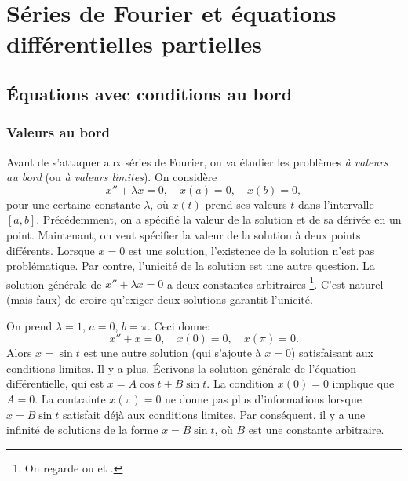 \chapter{Séries de Fourier et équations différentielles partielles} \label{FS:chapter}


\section{Équations avec conditions au bord} \label{bvp:section}


\subsection{Valeurs au bord}

Avant de s'attaquer aux séries de Fourier, on va étudier les problèmes \emph{à valeurs au bord}
 (ou \emph{à valeurs limites}).  On considère
\begin{equation*}
x'' + \lambda x = 0, \quad x(a) = 0, \quad x(b) = 0,
\end{equation*}
pour une certaine constante $\lambda$, où $x(t)$ prend ses valeurs  $t$ dans l'intervalle 
$[a,b]$.
Précédemment, on a spécifié la valeur de la solution et de sa dérivée en un point. Maintenant, on veut spécifier la valeur de la solution à deux points différents. Lorsque $x=0$ est une solution, l'existence de la solution n'est pas problématique. Par contre, l'unicité de la solution est une autre question. La solution générale de  $x'' + \lambda x = 0$ a deux constantes arbitraires \footnote{%
On regarde  ou  et
.}.
C'est naturel (mais faux) de croire qu'exiger deux solutions garantit l'unicité. 

\begin{example}
On prend $\lambda = 1$,
$a=0$, $b=\pi$.  Ceci donne: 
\begin{equation*}
x'' + x = 0, \quad x(0) = 0, \quad x(\pi) = 0.
\end{equation*}
Alors $x = \sin t$ est une autre solution  (qui s'ajoute à  $x=0$) satisfaisant aux conditions limites. Il y a plus. Écrivons la solution générale de l'équation différentielle, qui est  $x= A \cos t + B \sin t$.
La condition $x(0) = 0$ implique que $A=0$.  La contrainte $x(\pi) = 0$ ne donne pas plus d'informations lorsque $x = B \sin t$ satisfait déjà aux conditions limites. 
Par conséquent, il y a une infinité de solutions de la forme  $x = B \sin t$,
où $B$ est une constante arbitraire.  
\end{example}

